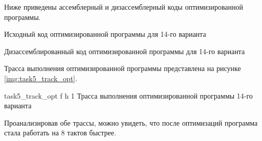 Ниже приведены  ассемблерный и дизассемблерный коды оптимизированной программы.

\clearpage 

 {Исходный код оптимизированной программы для 14-го варианта}

\clearpage 

 {Дизассемблированный код оптимизированной программы для 14-го варианта}

\clearpage

Трасса выполнения оптимизированной программы представлена на рисунке \ref{img:task5_track_opt}.

{task5_track_opt} %
{f} %
{h} %
{1\textwidth} %
{Трасса выполнения оптимизированной программы 14-го варианта} %

Проанализировав обе трассы, можно увидеть, что после оптимизаций программа стала работать на 8 тактов быстрее.
